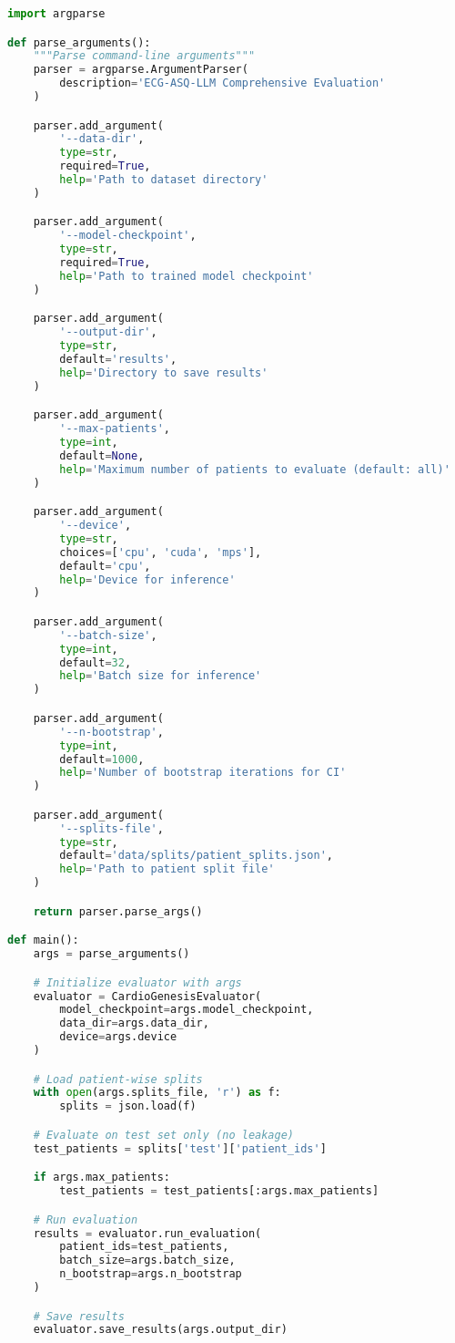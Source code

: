 \documentclass[11pt]{article}
\begin{document}
\begin{lstlisting}[language=Python, caption=Flexible Evaluation Script with CLI]
import argparse

def parse_arguments():
    """Parse command-line arguments"""
    parser = argparse.ArgumentParser(
        description='ECG-ASQ-LLM Comprehensive Evaluation'
    )

    parser.add_argument(
        '--data-dir',
        type=str,
        required=True,
        help='Path to dataset directory'
    )

    parser.add_argument(
        '--model-checkpoint',
        type=str,
        required=True,
        help='Path to trained model checkpoint'
    )

    parser.add_argument(
        '--output-dir',
        type=str,
        default='results',
        help='Directory to save results'
    )

    parser.add_argument(
        '--max-patients',
        type=int,
        default=None,
        help='Maximum number of patients to evaluate (default: all)'
    )

    parser.add_argument(
        '--device',
        type=str,
        choices=['cpu', 'cuda', 'mps'],
        default='cpu',
        help='Device for inference'
    )

    parser.add_argument(
        '--batch-size',
        type=int,
        default=32,
        help='Batch size for inference'
    )

    parser.add_argument(
        '--n-bootstrap',
        type=int,
        default=1000,
        help='Number of bootstrap iterations for CI'
    )

    parser.add_argument(
        '--splits-file',
        type=str,
        default='data/splits/patient_splits.json',
        help='Path to patient split file'
    )

    return parser.parse_args()

def main():
    args = parse_arguments()

    # Initialize evaluator with args
    evaluator = CardioGenesisEvaluator(
        model_checkpoint=args.model_checkpoint,
        data_dir=args.data_dir,
        device=args.device
    )

    # Load patient-wise splits
    with open(args.splits_file, 'r') as f:
        splits = json.load(f)

    # Evaluate on test set only (no leakage)
    test_patients = splits['test']['patient_ids']

    if args.max_patients:
        test_patients = test_patients[:args.max_patients]

    # Run evaluation
    results = evaluator.run_evaluation(
        patient_ids=test_patients,
        batch_size=args.batch_size,
        n_bootstrap=args.n_bootstrap
    )

    # Save results
    evaluator.save_results(args.output_dir)
\end{lstlisting}
\end{document}
